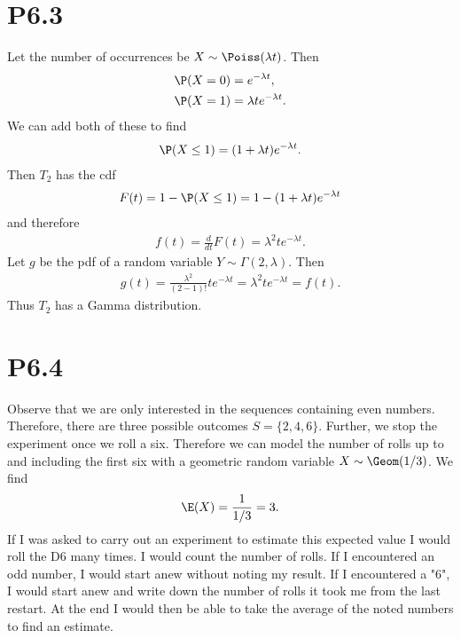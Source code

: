 \documentclass{article}
\begin{document}
\section*{P6.3}


Let the number of occurrences be $X\sim\Poiss(\lambda t)$. Then
\begin{align*}
  \P(X=0)&=e^{-\lambda t},\\
  \P(X=1)&=\lambda te^{-\lambda t}.
\end{align*} 
We can add both of these to find
\begin{align*}
  \P(X\leq 1) = (1+\lambda t)e^{-\lambda t}.
\end{align*}
Then $T_2$ has the cdf
\begin{align*}
  F(t) = 1 - \P(X\leq 1) = 1-(1+\lambda t)e^{-\lambda t}
\end{align*}
and therefore
\begin{align*}
  f(t) = \frac{d}{dt}F(t) = \lambda^2te^{-\lambda t}.
\end{align*}
Let $g$ be the pdf of a random variable $Y\sim\Gamma(2,\lambda)$. Then
\begin{align*}
  g(t) = \frac{\lambda^2}{(2-1)!}te^{-\lambda t} = \lambda^2te^{-\lambda t} = f(t).
\end{align*}
Thus $T_2$ has a Gamma distribution.


\section*{P6.4}


Observe that we are only interested in the sequences containing even numbers.
Therefore, there are three possible outcomes $S=\{2,4,6\}$. Further,
we stop the experiment once we roll a six. Therefore we can model the 
number of rolls up to and including the first six with a geometric random
variable $X\sim\Geom(1/3)$. We find
\begin{align*}
  \E(X)=\frac{1}{1/3} = 3.
\end{align*}
If I was asked to carry out an experiment to estimate this expected value
I would roll the D6 many times. I would count the number of rolls. If I
encountered an odd number, I would start anew without noting my result.
If I encountered a "6", I would start anew and write down the number of
rolls it took me from the last restart. At the end I would then be able
to take the average of the noted numbers to find an estimate.
\end{document}
